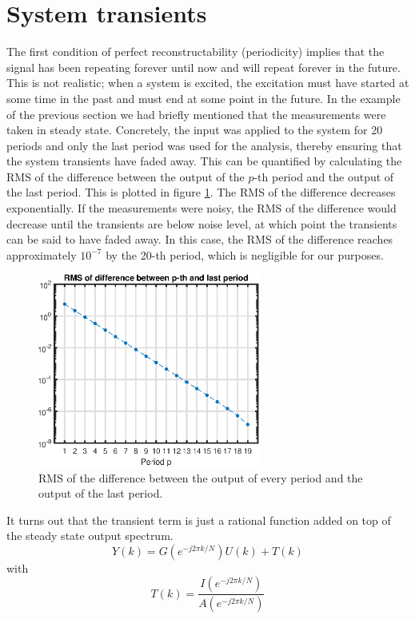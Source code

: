 \section{System transients}
\label{sec:system_transients}
The first condition of perfect reconstructability (periodicity) implies that the signal has been repeating forever until now and will repeat forever in the future. This is not realistic; when a system is excited, the excitation must have started at some time in the past and must end at some point in the future. In the example of the previous section we had briefly mentioned that the measurements were taken in steady state. Concretely, the input was applied to the system for 20 periods and only the last period was used for the analysis, thereby ensuring that the system transients have faded away. This can be quantified by calculating the RMS of the difference between the output of the $p$-th period and the output of the last period. This is plotted in figure \ref{fig:MS_transients_RMS_error}. The RMS of the difference decreases exponentially. If the measurements were noisy, the RMS of the difference would decrease until the transients are below noise level, at which point the transients can be said to have faded away. In this case, the RMS of the difference reaches approximately $10^{-7}$ by the 20-th period, which is negligible for our purposes.

\begin{figure}[H]
    \centering
    \includegraphics[width=0.65\textwidth]{figures/MS_transients_RMS_error.eps}
    \caption{RMS of the difference between the output of every period and the output of the last period.}
    \label{fig:MS_transients_RMS_error}
\end{figure}

It turns out that the transient term is just a rational function added on top of the steady state output spectrum.
\begin{equation}
\boxed{
    Y(k) = G(e^{-j 2 \pi k/N}) U(k) + T(k)
    }
    \label{eq:Y=GU+T}
\end{equation}
with
\begin{equation*}
    T(k) = \frac{I(e^{-j 2 \pi k/N})}{A(e^{-j 2 \pi k/N})}
\end{equation*}

